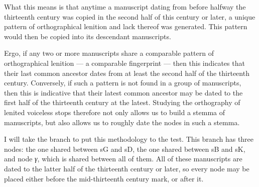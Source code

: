 What this means is that anytime a manuscript dating from before halfway the thirteenth century was copied in the second half of this century or later, a unique pattern of orthographical lenition and lack thereof was generated. This pattern would then be copied into its descendant manuscripts.

Ergo, if any two or more manuscripts share a comparable pattern of orthographical lenition --- a comparable fingerprint --- then this indicates that their last common ancestor dates from at least the second half of the thirteenth century. Conversely, if such a pattern is not found in a group of manuscripts, then this is indicative that their latest common ancestor may be dated to the first half of the thirteenth century at the latest. Studying the orthography of lenited voiceless stops therefore not only allows us to build a stemma of manuscripts, but also allows us to roughly date the nodes in such a stemma.


I will take the branch  to put this methodology to the test. This branch has three nodes: the one shared between \gls{sG} and \gls{sD}, the one shared between \gls{sB} and \gls{sK}, and node \textit{γ}, which is shared between all of them. All of these manuscripts are dated to the latter half of the thirteenth century or later, so every node may be placed either before the mid-thirteenth century mark, or after it.

